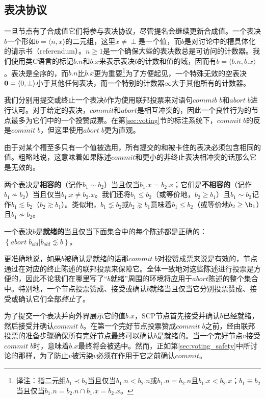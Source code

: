\subsection{表决协议}
一旦节点有了合成值它们将参与表决协议，尽管提名会继续更新合成值。一个表决$b$一个形如$b=\langle n,x\rangle$的二元组，这里$x\neq \perp$是一个值，而$b$是对讨论中的槽具体化的请示书（referendum）。$n\geq 1$是一个确保大些的表决数总是可访问的计数器。我们使用类C语言的标记$b.n$和$b.x$来表示表决$b$的计数和值的域，因而有$b=\langle b.n, b.x\rangle$。表决是全序的，而$b.n$比$b.x$更为重要{\footnote{译注：指二元组$b_1\prec b_2$当且仅当$b_1.n < b_2.n$或$b_1.n=b_2.n $且$b_1.x < b_2.x$；$b_1\equiv b_2$当且仅当$b_1.n=b_2.n\cap b_1.x=b_2.x$。}}为了方便起见，一个特殊无效的空表决${\bm 0}=\langle 0,\perp\rangle$小于其他任何表决，而一个特别的计数器$\infty$大于其他所有的计数器。

我们分别用提交或终止一个表决$b$作为使用联邦投票来对语句$commib\;b$和$abort\;b$进行认可。对于给定的表决，$commit$和$abort$是相互冲突的，因此一个良性行为的节点最多为它们中的一个投赞成票。在第\ref{sec:voting}节的标注系统下，$commit\;b$的反是$\overline{commit\;b}$，但这里使用$abort\;b$更为直观。

由于对某个槽至多只有一个值被选用，所有提交的和被卡住的表决必须包含相同的值。粗略地说，这意味着如果陈述$commit$和更小的非终止表决相冲突的话那么它是无效的。

\begin{definition}[相容的]
        两个表决是\textbf{相容的}（记作$b_1 \sim b_2$）当且仅当$b_1.x=b_2.x$；它们是\textbf{不相容的}（记作$b_1\not\sim b_2$）当且仅当$b_1.x\neq b_2.x$。我们还将$b_1\leq b_2$（或等价地，$b_2\geq b_1$）且$b_1\sim b_2$记作$b_1\lesssim b_2$（$b_2\gtrsim b_1$）。类似地，$b_1\lnsim b_2$或$b_2\gnsim b_1$意味着$b_1\leq b_2$（或等价地$b_2\geq \b_1$）且$b_1\not\sim b_2$。
\end{definition}

\begin{definition}[就绪的]
        一个表决$b$是\textbf{就绪的}当且仅当下面集合中的每个陈述都是正确的：$\left\{abort\;b_{old}|b_{old}\lnsim b\right\}$。
\end{definition}

更准确地说，如果$b$被确认是就绪的话那$commit\;b$对投赞成票来说是有效的，节点通过在对应的终止陈述的联邦投票来保障它。全体一致地对这些陈述进行投票是方便的，因此不论我们在哪里写了``$b$就绪''周围的环境将应用于$abort$陈述的整个集合中。特别地，一个节点投票赞成、接受或确认$b$就绪当且仅当它分别投票赞成、接受或确认它们全部\textit{终止}了。

为了提交一个表决并向外界展示它的值$b.x$，SCP节点首先接受并确认$b$已经就绪，然后接受并确认$commit\;b$。在第一个完好节点投票赞成$commit\;b$之前，经由联邦投票的准备步骤确保所有完好节点最终可以确认$b$是就绪的。当一个完好节点$v$接受$commit\;b$时，意味着$b.x$最终将会被选中。然而，正如第\ref{sec:voting_safety}中所讨论的那样，为了防止$v$被污染$v$必须在作用于它之前确认$commit$。


